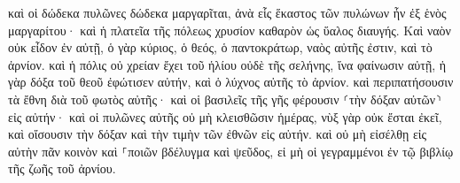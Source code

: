 \documentclass{openreader}
\begin{document}
καὶ οἱ δώδεκα πυλῶνες δώδεκα μαργαρῖται, ἀνὰ εἷς ἕκαστος τῶν πυλώνων ἦν ἐξ ἑνὸς μαργαρίτου· καὶ ἡ πλατεῖα τῆς πόλεως χρυσίον καθαρὸν ὡς ὕαλος διαυγής. 
Καὶ ναὸν οὐκ εἶδον ἐν αὐτῇ, ὁ γὰρ κύριος, ὁ θεός, ὁ παντοκράτωρ, ναὸς αὐτῆς ἐστιν, καὶ τὸ ἀρνίον. 
καὶ ἡ πόλις οὐ χρείαν ἔχει τοῦ ἡλίου οὐδὲ τῆς σελήνης, ἵνα φαίνωσιν αὐτῇ, ἡ γὰρ δόξα τοῦ θεοῦ ἐφώτισεν αὐτήν, καὶ ὁ λύχνος αὐτῆς τὸ ἀρνίον. 
καὶ περιπατήσουσιν τὰ ἔθνη διὰ τοῦ φωτὸς αὐτῆς· καὶ οἱ βασιλεῖς τῆς γῆς φέρουσιν ⸂τὴν δόξαν αὐτῶν⸃ εἰς αὐτήν· 
καὶ οἱ πυλῶνες αὐτῆς οὐ μὴ κλεισθῶσιν ἡμέρας, νὺξ γὰρ οὐκ ἔσται ἐκεῖ, 
καὶ οἴσουσιν τὴν δόξαν καὶ τὴν τιμὴν τῶν ἐθνῶν εἰς αὐτήν. 
καὶ οὐ μὴ εἰσέλθῃ εἰς αὐτὴν πᾶν κοινὸν καὶ ⸀ποιῶν βδέλυγμα καὶ ψεῦδος, εἰ μὴ οἱ γεγραμμένοι ἐν τῷ βιβλίῳ τῆς ζωῆς τοῦ ἀρνίου. 
\end{document}
